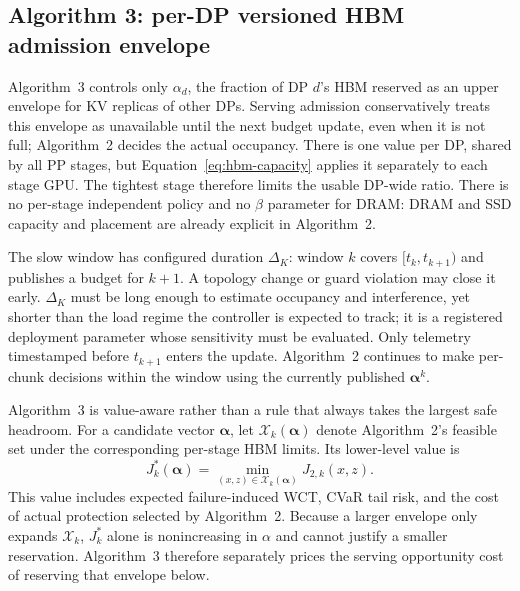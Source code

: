 \subsection{Algorithm 3: per-DP versioned HBM admission envelope}
\label{sec:alg3}

Algorithm~3 controls only $\alpha_d$, the fraction of DP $d$'s HBM reserved as
an upper envelope for KV replicas of other DPs.  Serving admission conservatively
treats this envelope as unavailable until the next budget update, even when it
is not full; Algorithm~2 decides the actual occupancy.  There is one value per DP, shared by all PP
stages, but Equation~\ref{eq:hbm-capacity} applies it separately to each stage
GPU.  The tightest stage therefore limits the usable DP-wide ratio.  There is
no per-stage independent policy and no $\beta$ parameter for DRAM: DRAM and SSD
capacity and placement are already explicit in Algorithm~2.

The slow window has configured duration $\Delta_K$: window $k$ covers
$[t_k,t_{k+1})$ and publishes a budget for $k+1$.  A topology change or guard
violation may close it early.  $\Delta_K$ must be long enough to estimate
occupancy and interference, yet shorter than the load regime the controller is
expected to track; it is a registered deployment parameter whose sensitivity
must be evaluated.  Only telemetry timestamped before $t_{k+1}$ enters the
update.  Algorithm~2 continues to make per-chunk decisions within the window
using the currently published $\boldsymbol\alpha^k$.

Algorithm~3 is value-aware rather than a rule that always takes the largest
safe headroom.  For a candidate vector $\boldsymbol\alpha$, let
$\mathcal X_k(\boldsymbol\alpha)$ denote Algorithm~2's feasible set under the
corresponding per-stage HBM limits.  Its lower-level value is
\begin{equation}
  J_k^*(\boldsymbol\alpha)=
    \min_{(x,z)\in\mathcal X_k(\boldsymbol\alpha)}J_{2,k}(x,z).
  \label{eq:alpha-value}
\end{equation}
This value includes expected failure-induced WCT, CVaR tail risk, and the cost
of actual protection selected by Algorithm~2.  Because a larger envelope only
expands $\mathcal X_k$, $J_k^*$ alone is nonincreasing in $\alpha$ and cannot
justify a smaller reservation.  Algorithm~3 therefore separately prices the
serving opportunity cost of reserving that envelope below.

